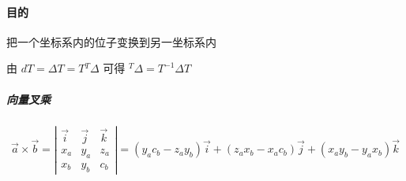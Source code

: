 \documentclass[11pt]{book}
\begin{document}
\paragraph{目的}%
\label{par:mu_de_}

把一个坐标系内的位子变换到另一坐标系内

由 $dT = \Delta T = T {}^T \Delta$ 可得 ${}^T \Delta = T^{-1} \Delta T$

\subparagraph{向量叉乘}%
\label{par:xiang_liang_cha_cheng_}

$$
	\vec a \times \vec b = 
	\left|
		\begin{matrix}
			\vec i & \vec j & \vec k \\
			x_a & y_a & z_a \\
			x_b & y_b & c_b
		\end{matrix}
	\right|
	= (y_a c_b - z_a y_b) \vec i + (z_a x_b - x_a c_b) \vec j + (x_a y_b - y_a x_b) \vec k
$$
\end{document}
